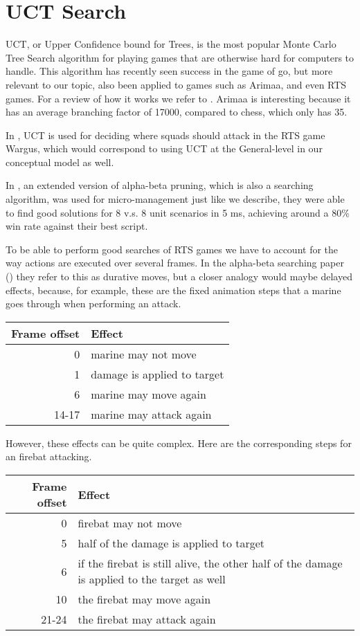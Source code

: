 \section{UCT Search}
UCT, or Upper Confidence bound for Trees, is the most popular Monte Carlo Tree Search algorithm for playing games that are otherwise hard for computers to handle.
This algorithm has recently seen success in the game of go, but more relevant to our topic, also been applied to games such as Arimaa, and even RTS games. For a review of how it works we refer to \cite{mcts}.
Arimaa is interesting because it has an average branching factor of 17000, compared to chess, which only has 35. \cite{arimaawiki}

In \cite{wargusuct}, UCT is used for deciding where squads should attack in the RTS game Wargus, which would correspond to using UCT at the General-level in our conceptual model as well.

In \cite{abcd}, an extended version of alpha-beta pruning, which is also a searching algorithm, was used for micro-management just like we describe, they were able to find good solutions for 8 v.s. 8 unit scenarios in 5 ms, achieving around a 80\% win rate against their best script.



To be able to perform good searches of RTS games we have to account for the way actions are executed over several frames. In the alpha-beta searching paper (\cite{abcd}) they refer to this as durative moves, but a closer analogy would maybe delayed effects, because, for example, these are the fixed animation steps that a marine goes through when performing an attack.

\begin{center}
\begin{tabular}{ r | p{} }
Frame offset & Effect \\
\hline
0 & marine may not move \\
1 & damage is applied to target \\
6 & marine may move again \\
14-17 & marine may attack again\footnotemark
\end{tabular}
\end{center}

However, these effects can be quite complex. Here are the corresponding steps for an firebat attacking.


\begin{center}
\begin{tabular}{ r | p{} }
Frame offset & Effect \\
\hline
0 & firebat may not move \\
5 & half of the damage is applied to target \\
6 & if the firebat is still alive, the other half of the damage is applied to the target as well \\
10 & the firebat may move again \\
21-24 & the firebat may attack again
\end{tabular}
\end{center}

